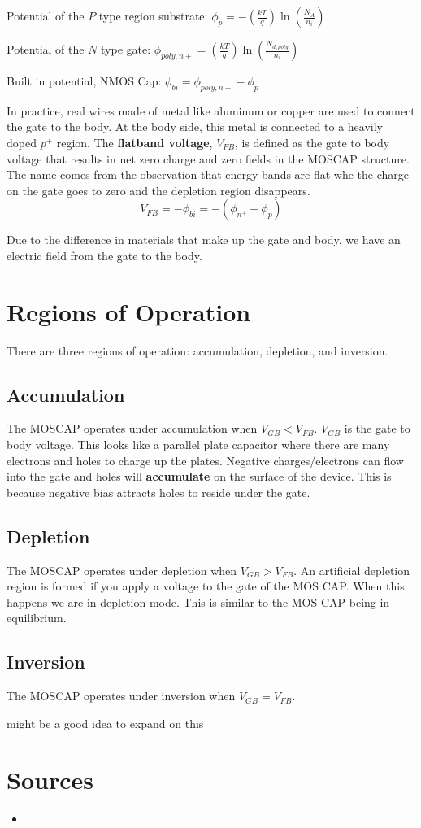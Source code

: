 \begin{gline}
    \item[] Potential of the $P$ type region substrate: $\phi_p = -(\frac{kT}{q}) \ln(\frac{N_A}{n_i})$ 
    \item[] Potential of the $N$ type gate: $\phi_{poly,n+} = (\frac{kT}{q}) \ln(\frac{N_{d,poly}}{n_i})$
    \item[] Built in potential, NMOS Cap: $\phi_{bi} = \phi_{poly,n+} - \phi_p$
\end{gline}
In practice, real wires made of metal like aluminum or copper are used to connect the gate to the body. At the body side, this metal is connected to a heavily doped $p^+$ region. The \textbf{flatband voltage}, $V_{FB}$, is defined as the gate to body voltage that results in net zero charge and zero fields in the MOSCAP structure. The name comes from the observation that energy bands are flat whe the charge on the gate goes to zero and the depletion region disappears.
    \[V_{FB} = -\phi_{bi} = -(\phi_{n^+} - \phi_p)\]

Due to the difference in materials that make up the gate and body, we have an electric field from the gate to the body. 
\section{Regions of Operation}
There are three regions of operation: accumulation, depletion, and inversion. 

\subsection{Accumulation}
The MOSCAP operates under accumulation when $V_{GB} < V_{FB}$. $V_{GB}$ is the gate to body voltage. This looks like a parallel plate capacitor where there are many electrons and holes to charge up the plates. Negative charges/electrons can flow into the gate and holes will \textbf{accumulate} on the surface of the device. This is because negative bias attracts holes to reside under the gate. 

\subsection{Depletion}
The MOSCAP operates under depletion when $V_{GB} > V_{FB}$. An artificial depletion region is formed if you apply a voltage to the gate of the MOS CAP. When this happens we are in depletion mode. This is similar to the MOS CAP being in equilibrium.

\subsection{Inversion}
The MOSCAP operates under inversion when $V_{GB} = V_{FB}$.
\begin{todo}
    \item might be a good idea to expand on this
\end{todo}



\section{Sources}
\begin{itemize}
    \item 
\end{itemize}